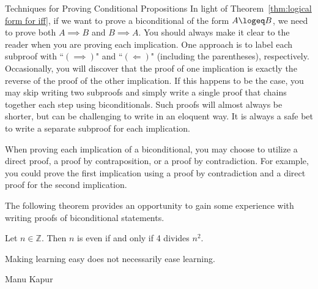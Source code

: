 \begin{section}{Techniques for Proving Conditional Propositions}
In light of Theorem~\ref{thm:logical form for iff}, if we want to prove a biconditional of the form $A\logeq B$, we need to prove both $A\implies B$ and $B\implies A$.  You should always make it clear to the reader when you are proving each implication. One approach is to label each subproof with ``$(\implies)$" and ``$(\Longleftarrow)$" (including the parentheses), respectively.  Occasionally, you will discover that the proof of one implication is exactly the reverse of the proof of the other implication.  If this happens to be the case, you may skip writing two subproofs and simply write a single proof that chains together each step using biconditionals.  Such proofs will almost always be shorter, but can be challenging to write in an eloquent way.  It is always a safe bet to write a separate subproof for each implication.

When proving each implication of a biconditional, you may choose to utilize a direct proof, a proof by contraposition, or a proof by contradiction.  For example, you could prove the first implication using a proof by contradiction and a direct proof for the second implication.

The following theorem provides an opportunity to gain some experience with writing proofs of biconditional statements.

\begin{theorem}
Let $n\in\mathbb{Z}$. Then $n$ is even if and only if 4 divides $n^2$.
\end{theorem} 

\epigraph{Making learning easy does not necessarily ease learning.}{Manu Kapur}

\end{section}